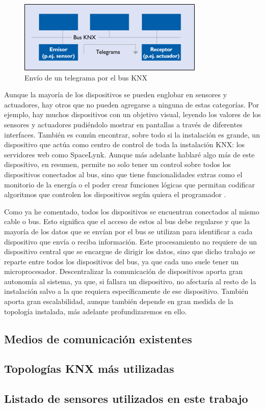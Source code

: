 \begin{figure}
    \centering
    \includegraphics{imagenes/capitulo1/envioTelegrama.png}
    \caption{Envío de un telegrama por el bus KNX}
    \label{fig:envio_telegrama}
\end{figure}

Aunque la mayoría de los dispositivos se pueden englobar en sensores y actuadores, hay otros que no pueden agregarse a ninguna de estas categorías. Por ejemplo, hay muchos dispositivos con un objetivo visual, leyendo los valores de los sensores y actuadores pudiéndolo mostrar en pantallas a través de diferentes interfaces. También es común encontrar, sobre todo si la instalación es grande, un dispositivo que actúa como centro de control de toda la instalación KNX: los servidores web como SpaceLynk. Aunque más adelante hablaré algo más de este dispositivo, en resumen, permite no solo tener un control sobre todos los dispositivos conectados al bus, sino que tiene funcionalidades extras como el monitorio de la energía o el poder crear funciones lógicas que permitan codificar algoritmos que controlen los dispositivos según quiera el programador \cite{intro_6}.

Como ya he comentado, todos los dispositivos se encuentran conectados al mismo cable o bus. Esto significa que el acceso de estos al bus debe regularse y que la mayoría de los datos que se envían por el bus se utilizan para identificar a cada dispositivo que envía o reciba información. 
Este procesamiento no requiere de un dispositivo central que se encargue de dirigir los datos, sino que dicho trabajo se reparte entre todos los dispositivos del bus, ya que cada uno suele tener un microprocesador. Descentralizar la comunicación de dispositivos aporta gran autonomía al sistema, ya que, si fallara un dispositivo, no afectaría al resto de la instalación salvo a la que requiera específicamente de ese dispositivo. También aporta gran escalabilidad, aunque también depende en gran medida de la topología instalada, más adelante profundizaremos en ello.

\subsection{Medios de comunicación existentes}

\subsection{Topologías KNX más utilizadas}

\subsection{Listado de sensores utilizados en este trabajo}